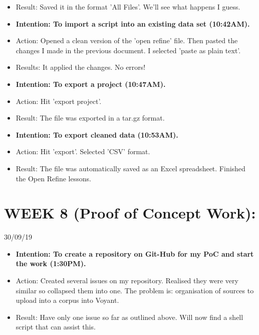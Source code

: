 \documentclass[a4paper,12pt]{article}
\begin{document}
\begin{itemize}
\begin {itemize}
\item Result: Saved it in the format 'All Files'. We'll see what happens I guess.

\item \textbf{Intention: To import a script into an existing data set (10:42AM).}

\item Action: Opened a clean version of the 'open refine' file. Then pasted the changes I made in the previous document. I selected 'paste as plain text'. 

\item Results: It applied the changes. No errors!

\item \textbf{Intention: To export a project (10:47AM).}

\item Action: Hit 'export project'. 

\item Result: The file was exported in a tar.gz format. 
\item \textbf{Intention: To export cleaned data (10:53AM).}

\item Action: Hit 'export'. Selected 'CSV' format. 

\item Result: The file was automatically saved as an Excel spreadsheet. Finished the Open Refine lessons. 

\end{itemize}

\section{WEEK 8 (Proof of Concept Work):}


30/09/19


\begin{itemize}
  
\item \textbf{Intention: To create a repository on Git-Hub for my PoC and start the work (1:30PM).}
    
    
\item {Action: Created several issues on my repository. Realised they were very similar so collapsed them into one. The problem is: organisation of sources to upload into a corpus into Voyant.}


\item {Result: Have only one issue so far as outlined above. Will now find a shell script that can assist this.}
    

\end{itemize}
\end{itemize}
\end{document}
